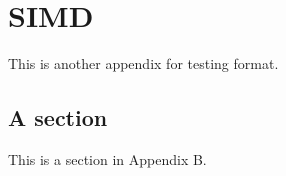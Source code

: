 \chapter{SIMD} \label{appendixB}

This is another appendix for testing format.

\section{A section} \label{appBsect}

This is a section in Appendix B.

